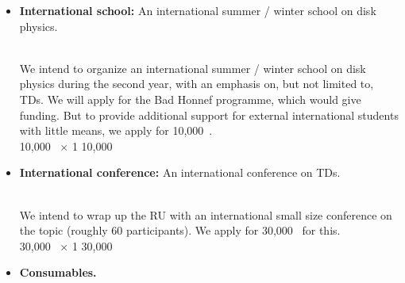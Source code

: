 \documentclass[10pt,fleqn,twoside]{article}
\begin{document}
\begin{itemize}
\item 
\begin{Emphasize}
{\bf International school:} An international summer / winter school on disk physics.
\end{Emphasize}\\
We intend to organize an international summer / winter school on disk physics
during the second year,
with an emphasis on, but not limited to, TDs. We will apply for the Bad Honnef
programme, which would give funding. But to provide additional support for
external international students with little means, we apply for 10,000~\EUR{}. 
\vspace{0.2em}\\
10,000~\EUR{} $\times$ 1              \hfill 10,000~\EUR{}\\
\item 
\begin{Emphasize}
{\bf International conference:} An international conference on TDs.
\end{Emphasize}\\
We intend to wrap up the RU with an international small size conference
on the topic (roughly 60 participants). We apply for 30,000~\EUR{} for this.
\vspace{0.2em}\\
30,000~\EUR{} $\times$ 1              \hfill 30,000~\EUR{}\\
\item 
\begin{Emphasize}
{\bf Consumables.}
\end{Emphasize}\\

\end{itemize}
\end{document}
